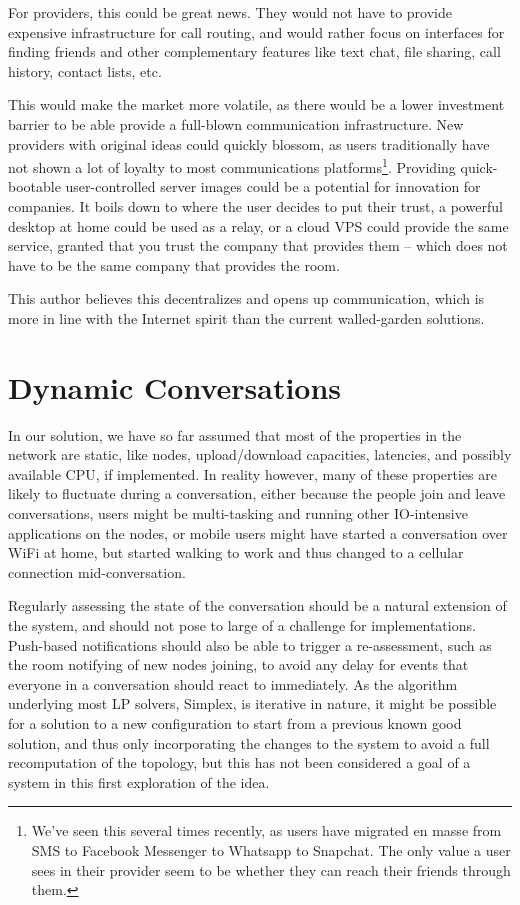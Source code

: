 For providers, this could be great news. They would not have to provide expensive infrastructure for call routing, and would rather focus on interfaces for finding friends and other complementary features like text chat, file sharing, call history, contact lists, etc.

This would make the market more volatile, as there would be a lower investment barrier to be able provide a full-blown communication infrastructure. New providers with original ideas could quickly blossom, as users traditionally have not shown a lot of loyalty to most communications platforms\footnote{We've seen this several times recently, as users have migrated en masse from SMS to Facebook Messenger to Whatsapp to Snapchat. The only value a user sees in their provider seem to be whether they can reach their friends through them.}. Providing quick-bootable user-controlled server images could be a potential for innovation for companies. It boils down to where the user decides to put their trust, a powerful desktop at home could be used as a relay, or a cloud VPS could provide the same service, granted that you trust the company that provides them -- which does not have to be the same company that provides the room.

This author believes this decentralizes and opens up communication, which is more in line with the Internet spirit than the current walled-garden solutions.


\section{Dynamic Conversations}\label{sec:dynamic-conversations}

In our solution, we have so far assumed that most of the properties in the network are static, like nodes, upload/download capacities, latencies, and possibly available CPU, if implemented. In reality however, many of these properties are likely to fluctuate during a conversation, either because the people join and leave conversations, users might be multi-tasking and running other IO-intensive applications on the nodes, or mobile users might have started a conversation over WiFi at home, but started walking to work and thus changed to a cellular connection mid-conversation.

Regularly assessing the state of the conversation should be a natural extension of the system, and should not pose to large of a challenge for implementations. Push-based notifications should also be able to trigger a re-assessment, such as the room notifying of new nodes joining, to avoid any delay for events that everyone in a conversation should react to immediately. As the algorithm underlying most LP solvers, Simplex, is iterative in nature, it might be possible for a solution to a new configuration to start from a previous known good solution, and thus only incorporating the changes to the system to avoid a full recomputation of the topology, but this has not been considered a goal of a system in this first exploration of the idea.

